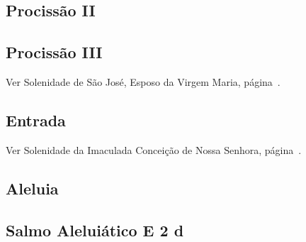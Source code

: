\AllowPageFlush

\subsection{Procissão II}\label{subsection:proprium-sanctorum/in-praesentatione-domini/ad-processionem-2}
\def\AntiphonAnnotation{\CantusID{004104}[Lc 2,24]}
\def\AntiphonScore{obtulerunt.8G/}

\subsection{Procissão III}
\begin{rubrica}
  Ver Solenidade de São José, Esposo da Virgem Maria, página~\pageref{subsection:proprium-sanctorum/sancti-ioseph-sponsi-bmv/psalmus-responsorius}.
\end{rubrica}

\AllowPageFlush

\subsection{Entrada}\label{subsection:proprium-sanctorum/in-praesentatione-domini/introitus}
\def\AntiphonAnnotation{\CantusID{005084}[Sl 48(47),10]}
\def\AntiphonScore{suscepimus-deus.8G/}


\begin{rubrica}
  Ver Solenidade da Imaculada Conceição de Nossa Senhora, página~\pageref{subsection:proprium-sanctorum/in-conceptione-immaculata-bmv/psalmus-responsorius}.
\end{rubrica}

\subsection{Aleluia}\label{subsection:proprium-sanctorum/in-praesentatione-domini/alleluia}
\def\AntiphonScore{alleluia.4E.1/}

\AllowPageFlush

\subsection[Salmo Aleluiático]{Salmo Aleluiático \textmd{E 2 d}}\label{subsection:proprium-sanctorum/in-praesentatione-domini/psalmus-alleluiaticus}

